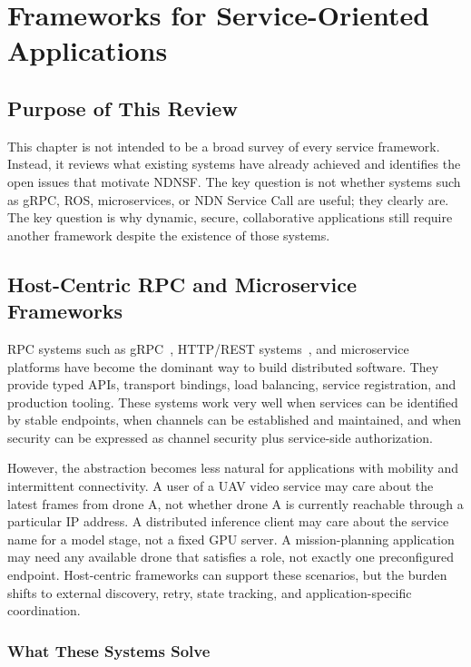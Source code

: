 \chapter{Frameworks for Service-Oriented Applications}
\label{chap:soa}

\section{Purpose of This Review}

This chapter is not intended to be a broad survey of every service framework.
Instead, it reviews what existing systems have already achieved and identifies
the open issues that motivate NDNSF. The key question is not whether systems
such as gRPC, ROS, microservices, or NDN Service Call are useful; they clearly
are. The key question is why dynamic, secure, collaborative applications still
require another framework despite the existence of those systems.

\section{Host-Centric RPC and Microservice Frameworks}

RPC systems such as gRPC~\cite{grpc}, HTTP/REST systems~\cite{fielding2000rest},
and microservice platforms have become the dominant way to build distributed
software. They provide typed APIs, transport bindings, load balancing, service
registration, and production tooling. These systems work very well when
services can be identified by stable endpoints, when channels can be
established and maintained, and when security can be expressed as channel
security plus service-side authorization.

However, the abstraction becomes less natural for applications with mobility
and intermittent connectivity. A user of a UAV video service may care about the
latest frames from drone A, not whether drone A is currently reachable through
a particular IP address. A distributed inference client may care about the
service name for a model stage, not a fixed GPU server. A mission-planning
application may need any available drone that satisfies a role, not exactly one
preconfigured endpoint. Host-centric frameworks can support these scenarios,
but the burden shifts to external discovery, retry, state tracking, and
application-specific coordination.

\subsection{What These Systems Solve}

